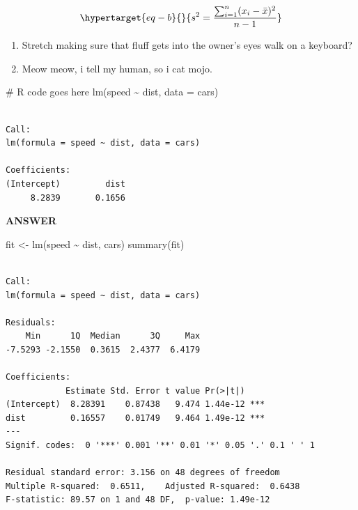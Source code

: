 \documentclass[
  10pt,
  letterpaper,
  DIV=11,
  numbers=noendperiod]{scrartcl}
\newenvironment{Shaded}{\begin{snugshade}}{\end{snugshade}}
\newcommand{\AttributeTok}[1]{\textcolor[rgb]{0.40,0.45,0.13}{#1}}
\newcommand{\CommentTok}[1]{\textcolor[rgb]{0.37,0.37,0.37}{#1}}
\newcommand{\FunctionTok}[1]{\textcolor[rgb]{0.28,0.35,0.67}{#1}}
\newcommand{\NormalTok}[1]{\textcolor[rgb]{0.00,0.23,0.31}{#1}}
\newcommand{\OtherTok}[1]{\textcolor[rgb]{0.00,0.23,0.31}{#1}}
\newcommand{\SpecialCharTok}[1]{\textcolor[rgb]{0.37,0.37,0.37}{#1}}
\providecommand{\tightlist}{%
  \setlength{\itemsep}{0pt}\setlength{\parskip}{0pt}}\usepackage{longtable,booktabs,array}
\begin{document}
\begin{equation}\protect\hypertarget{eq-b}{}{ s^2 = \frac{\sum_{i=1}^n (x_i - \bar{x})^2}{n-1} }\label{eq-b}\end{equation}

\begin{enumerate}
\def\labelenumi{\alph{enumi}.}
\tightlist
\item
  Stretch making sure that fluff gets into the owner's eyes walk on a
  keyboard?
\item
  Meow meow, i tell my human, so i cat mojo.
\end{enumerate}

\begin{Shaded}
\begin{Highlighting}[]
\CommentTok{\# R code goes here}
\FunctionTok{lm}\NormalTok{(speed }\SpecialCharTok{\textasciitilde{}}\NormalTok{ dist, }\AttributeTok{data =}\NormalTok{ cars)}
\end{Highlighting}
\end{Shaded}

\begin{verbatim}

Call:
lm(formula = speed ~ dist, data = cars)

Coefficients:
(Intercept)         dist  
     8.2839       0.1656  
\end{verbatim}

\begin{tcolorbox}[enhanced jigsaw, leftrule=.75mm, colframe=quarto-callout-tip-color-frame, colback=white, opacityback=0, breakable, rightrule=.15mm, left=2mm, bottomrule=.15mm, toprule=.15mm, arc=.35mm]

\textbf{ANSWER}\vspace{2mm}

\begin{Shaded}
\begin{Highlighting}[]
\NormalTok{fit }\OtherTok{\textless{}{-}} \FunctionTok{lm}\NormalTok{(speed }\SpecialCharTok{\textasciitilde{}}\NormalTok{ dist, cars)}
\FunctionTok{summary}\NormalTok{(fit)}
\end{Highlighting}
\end{Shaded}

\begin{verbatim}

Call:
lm(formula = speed ~ dist, data = cars)

Residuals:
    Min      1Q  Median      3Q     Max 
-7.5293 -2.1550  0.3615  2.4377  6.4179 

Coefficients:
            Estimate Std. Error t value Pr(>|t|)    
(Intercept)  8.28391    0.87438   9.474 1.44e-12 ***
dist         0.16557    0.01749   9.464 1.49e-12 ***
---
Signif. codes:  0 '***' 0.001 '**' 0.01 '*' 0.05 '.' 0.1 ' ' 1

Residual standard error: 3.156 on 48 degrees of freedom
Multiple R-squared:  0.6511,    Adjusted R-squared:  0.6438 
F-statistic: 89.57 on 1 and 48 DF,  p-value: 1.49e-12
\end{verbatim}

\end{tcolorbox}
\end{document}
